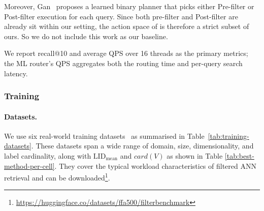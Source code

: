 \begin{itemize}
Moreover, Gan~\cite{LearningBasedQueryPlanning2026} proposes a learned binary planner that picks either Pre-filter or Post-filter execution for each query. Since both pre-filter and Post-filter are already sit within our setting, the action space of \cite{LearningBasedQueryPlanning2026} is therefore a strict subset of ours. So we do not include this work as our baseline.

\end{itemize}

We report recall@10 and average QPS over 16 threads as the primary metrics; the ML router's QPS aggregates both the routing time and per-query search latency.



\subsubsection{Training}


\paragraph{Datasets.}
We use six real-world training datasets~\cite{FilteredANNBenchmark2024} as summarised in Table~\ref{tab:training-datasets}. These datasets span a wide range of domain, size, dimensionality, and label cardinality, along with $\mathrm{LID}_{\mathrm{mean}}$ and $card(V)$ as shown in Table \ref{tab:best-method-per-cell}. They cover the typical workload characteristics of filtered ANN retrieval and can be downloaded\footnote{\label{fn:datasets}\url{https://huggingface.co/datasets/ffa500/filterbenchmark}}.


